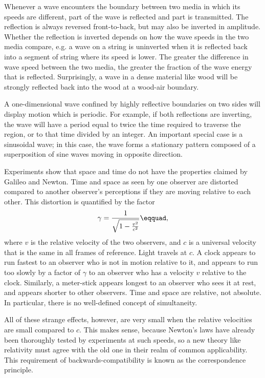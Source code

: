 	Whenever a wave encounters the boundary between two media in
	which its speeds are different, part of the wave is
	reflected and part is transmitted. The reflection is always
	reversed front-to-back, but may also be inverted in
	amplitude. Whether the reflection is inverted depends on how
	the wave speeds in the two media compare, e.g. a wave on a
	string  is uninverted when it is reflected back into a
	segment of string where its speed is lower. The greater the
	difference in wave speed between the two media, the greater
	the fraction of the wave energy that is reflected.
	Surprisingly, a wave in a dense material like wood will be
	strongly reflected back into the wood at a wood-air boundary.
	
	A one-dimensional wave confined by highly reflective
	boundaries on two sides will display motion which is
	periodic. For example, if both reflections are inverting,
	the wave will have a period equal to twice the time required
	to traverse the region, or to that time divided by an
	integer. An important special case is a sinusoidal wave; in
	this case, the wave forms a stationary pattern composed of a
	superposition of sine waves moving in opposite direction.

Experiments show that space and time do not have the properties claimed by Galileo and Newton.
Time and space as seen by one
observer are distorted compared to another observer's perceptions if they are moving
relative to each other. This distortion is quantified by the factor
\begin{equation*}
  \gamma = \frac{1}{\sqrt{1-\frac{v^2}{c^2}}}\eqquad,
\end{equation*}
where $v$ is the relative velocity of the two observers, and $c$ is a universal velocity
that is the same in all frames of reference. Light travels at $c$. A clock appears to run fastest to an
observer who is not in motion relative to it, and appears to run too slowly by a factor of
$\gamma$ to an observer who has a velocity $v$ relative to the clock. Similarly, a meter-stick
appears longest to an observer who sees it at rest, and appears shorter to other observers.
Time and space are relative, not absolute. In particular, there is no well-defined concept
of simultaneity.

All of these strange effects, however, are very small when the relative
velocities are small compared to $c$. This makes sense, because
Newton's laws have already been thoroughly tested by experiments at such speeds,
so a new theory like relativity must agree with the old one in their realm of
common applicability. This requirement of backwards-compatibility is known as
the correspondence principle.


